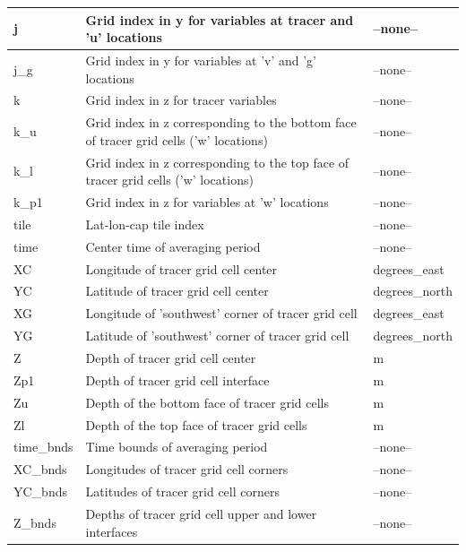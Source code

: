 \begin{longtable}{|m{}|m{}|m{}|}
j &Grid index in y for variables at tracer and 'u' locations &--none--  \\ \hline
j\_g &Grid index in y for variables at 'v' and 'g' locations &--none--  \\ \hline
k &Grid index in z for tracer variables &--none--  \\ \hline
k\_u &Grid index in z corresponding to the bottom face of tracer grid cells ('w' locations) &--none--  \\ \hline
k\_l &Grid index in z corresponding to the top face of tracer grid cells ('w' locations) &--none--  \\ \hline
k\_p1 &Grid index in z for variables at 'w' locations &--none--  \\ \hline
tile &Lat-lon-cap tile index &--none--  \\ \hline
time &Center time of averaging period &--none--  \\ \hline
XC &Longitude of tracer grid cell center &degrees\_east  \\ \hline
YC &Latitude of tracer grid cell center &degrees\_north  \\ \hline
XG &Longitude of 'southwest' corner of tracer grid cell &degrees\_east  \\ \hline
YG &Latitude of 'southwest' corner of tracer grid cell &degrees\_north  \\ \hline
Z &Depth of tracer grid cell center &m  \\ \hline
Zp1 &Depth of tracer grid cell interface &m  \\ \hline
Zu &Depth of the bottom face of tracer grid cells &m  \\ \hline
Zl &Depth of the top face of tracer grid cells &m  \\ \hline
time\_bnds &Time bounds of averaging period &--none--  \\ \hline
XC\_bnds &Longitudes of tracer grid cell corners &--none--  \\ \hline
YC\_bnds &Latitudes of tracer grid cell corners &--none--  \\ \hline
Z\_bnds &Depths of tracer grid cell upper and lower interfaces &--none--  \\ \hline
\end{longtable}

\newp
\pagebreak
